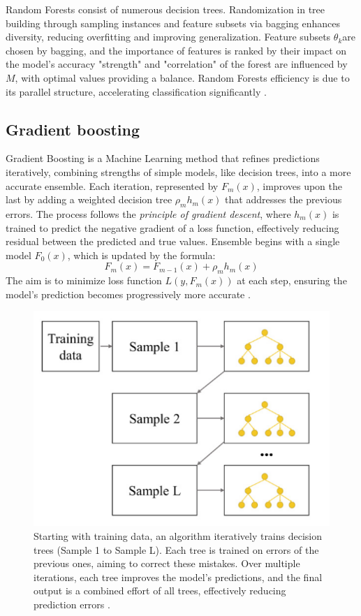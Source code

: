             Random Forests consist of numerous decision trees. Randomization in tree building through sampling instances and feature subsets via bagging enhances diversity, reducing overfitting and improving generalization. Feature subsets $\theta_k$​ are chosen by bagging, and the importance of features is ranked by their impact on the model's accuracy "strength" and "correlation" of the forest are influenced by $M$, with optimal values providing a balance. Random Forests efficiency is due to its parallel structure, accelerating classification significantly \cite{parmar_review_2019}.
            
        \subsection{Gradient boosting}
            Gradient Boosting is a Machine Learning method that refines predictions iteratively, combining strengths of simple models, like decision trees, into a more accurate ensemble. Each iteration, represented by $F_m(x)$, improves upon the last by adding a weighted decision tree $\rho_m h_m(x)$ that addresses the previous errors. The process follows the \textit{principle of gradient descent}, where $h_m(x)$ is trained to predict the negative gradient of a loss function, effectively reducing residual between the predicted and true values. Ensemble begins with a single model $F_0(x)$, which is updated by the formula:
            \begin{equation}
                F_m(x) = F_{m-1}(x) + \rho_m h_m(x)
            \end{equation}
            The aim is to minimize loss function $L(y, F_m(x))$ at each step, ensuring the model's prediction becomes progressively more accurate \cite{bentejac_comparative_2021}.
            \begin{figure}[H]
                \centering
                \includegraphics[width=.5\textwidth]{../src/resources/images/models/boosting.png}
                \caption{
                    Starting with training data, an algorithm iteratively trains decision trees (Sample 1 to Sample L). Each tree is trained on errors of the previous ones, aiming to correct these mistakes. Over multiple iterations, each tree improves the model's predictions, and the final output is a combined effort of all trees, effectively reducing prediction errors \cite{cha_comparison_2021}.
                }
                \label{fig:gradient_boosting}
            \end{figure}

